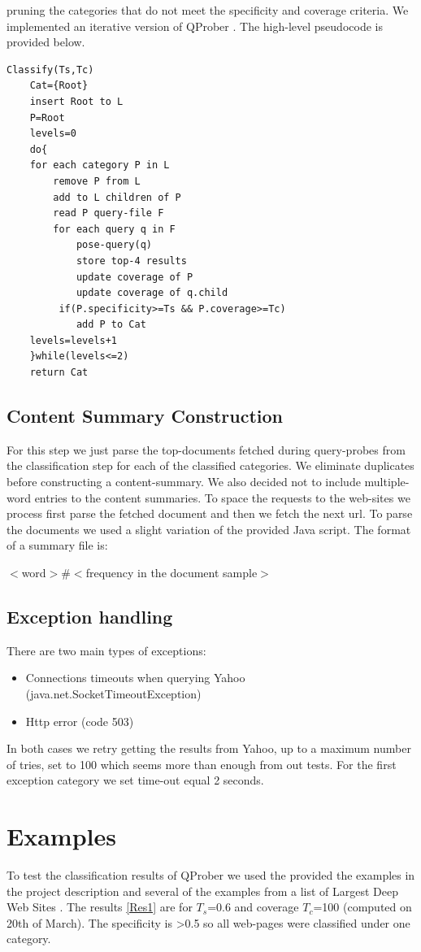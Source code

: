 \documentclass[11pt]{article}
\begin{document}
pruning the categories that do not meet the specificity and coverage criteria. We implemented an iterative version of QProber \cite{QProb}. The high-level pseudocode is provided below.

\begin{verbatim}
Classify(Ts,Tc)
    Cat={Root}
    insert Root to L
    P=Root
    levels=0
    do{
    for each category P in L
        remove P from L
        add to L children of P
        read P query-file F
        for each query q in F
            pose-query(q)
            store top-4 results
            update coverage of P
            update coverage of q.child
         if(P.specificity>=Ts && P.coverage>=Tc)
            add P to Cat
    levels=levels+1
    }while(levels<=2)
    return Cat
\end{verbatim}

\subsection{Content Summary Construction}
For this step we just parse the top-documents fetched during query-probes from the classification step for each of the classified categories. We eliminate duplicates before constructing a content-summary. We also decided not to include multiple-word entries to the content summaries. To space the requests to the web-sites we process first parse the fetched document and then we fetch
the next url. To parse the documents we used a slight variation of the provided Java script. The format of a summary file is:

$<$word$>\#<$frequency in the document sample$>$

\subsection{Exception handling}
There are two main types of exceptions:

\begin{itemize}
\item Connections timeouts when querying Yahoo (java.net.SocketTimeoutException)
\item Http error (code 503)
\end{itemize}

In both cases we retry getting the results from Yahoo, up to a maximum number of tries, set to 100 which seems more than enough from out tests. For the first exception category we set time-out equal 2 seconds.

\section{Examples}
To test the classification results of QProber we used the provided the examples in the project description and several of the examples from a list
of Largest Deep Web Sites \cite{AIP}. The results \ref{Res1} are for $T_s$=0.6 and coverage $T_c$=100 (computed on 20th of March). The specificity
is >0.5 so all web-pages were classified under one category.
\end{document}
